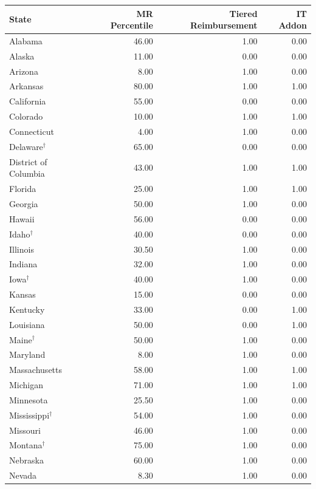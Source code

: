 \begin{table}[htbp]
\centering
\begin{tabular}{lrrr}
  \toprule
State & MR Percentile & Tiered Reimbursement & IT Addon \\ 
  \midrule
Alabama & 46.00 & 1.00 & 0.00 \\ 
  Alaska & 11.00 & 0.00 & 0.00 \\ 
  Arizona & 8.00 & 1.00 & 0.00 \\ 
  Arkansas & 80.00 & 1.00 & 1.00 \\ 
  California & 55.00 & 0.00 & 0.00 \\ 
  Colorado & 10.00 & 1.00 & 1.00 \\ 
  Connecticut & 4.00 & 1.00 & 0.00 \\ 
  Delaware$^{\dagger}$ & 65.00 & 0.00 & 0.00 \\ 
  District of Columbia & 43.00 & 1.00 & 1.00 \\ 
  Florida & 25.00 & 1.00 & 1.00 \\ 
  Georgia & 50.00 & 1.00 & 0.00 \\ 
  Hawaii & 56.00 & 0.00 & 0.00 \\ 
  Idaho$^{\dagger}$ & 40.00 & 0.00 & 0.00 \\ 
  Illinois & 30.50 & 1.00 & 0.00 \\ 
  Indiana & 32.00 & 1.00 & 0.00 \\ 
  Iowa$^{\dagger}$ & 40.00 & 1.00 & 0.00 \\ 
  Kansas & 15.00 & 0.00 & 0.00 \\ 
  Kentucky & 33.00 & 0.00 & 1.00 \\ 
  Louisiana & 50.00 & 0.00 & 1.00 \\ 
  Maine$^{\dagger}$ & 50.00 & 1.00 & 0.00 \\ 
  Maryland & 8.00 & 1.00 & 0.00 \\ 
  Massachusetts & 58.00 & 1.00 & 1.00 \\ 
  Michigan & 71.00 & 1.00 & 1.00 \\ 
  Minnesota & 25.50 & 1.00 & 0.00 \\ 
  Mississippi$^{\dagger}$ & 54.00 & 1.00 & 0.00 \\ 
  Missouri & 46.00 & 1.00 & 0.00 \\ 
  Montana$^{\dagger}$ & 75.00 & 1.00 & 0.00 \\ 
  Nebraska & 60.00 & 1.00 & 0.00 \\ 
  Nevada & 8.30 & 1.00 & 0.00 \\ 

\end{tabular}
\end{table}
